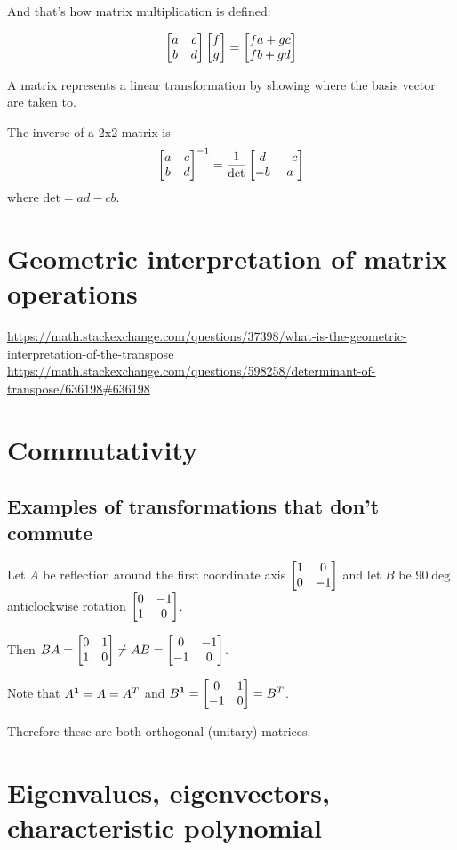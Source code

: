 And that's how matrix multiplication is defined:

$$
\begin{bmatrix}a & c\\b & d\\ \end{bmatrix} \begin{bmatrix}f\\g\end{bmatrix} = \begin{bmatrix}fa + gc\\fb + gd\end{bmatrix}
$$


A matrix represents a linear transformation by showing where the basis vector
are taken to.

\begin{theorem}
  The inverse of a 2x2 matrix is
  \begin{align*}
   \begin{bmatrix}a & c\\b & d\\ \end{bmatrix}^{-1}
  =
  \frac{1}{\text{det}} \begin{bmatrix}d  & -c\\-b & a\\ \end{bmatrix}
  \end{align*}
  where $\text{det} = ad - cb$.
\end{theorem}

\section{Geometric interpretation of matrix operations}
\url{https://math.stackexchange.com/questions/37398/what-is-the-geometric-interpretation-of-the-transpose}
\url{https://math.stackexchange.com/questions/598258/determinant-of-transpose/636198#636198}


\section{Commutativity}
\subsection{Examples of transformations that don't commute}
Let $A$ be reflection around the first coordinate axis $\begin{bmatrix}1 & 0\\0 & -1\\ \end{bmatrix}$
and let $B$ be $90\deg$ anticlockwise rotation $\begin{bmatrix}0 & -1\\1 & 0\\ \end{bmatrix}$.

Then $BA = \begin{bmatrix}0 & 1\\1 & 0\\ \end{bmatrix}
\neq  AB = \begin{bmatrix}0 & -1\\-1 & 0\\ \end{bmatrix}$.

Note that $A^{\mathbf 1} = A = A^T$ and $B^{\mathbf 1} = \begin{bmatrix}0 & 1\\-1 & 0\\ \end{bmatrix} = B^T$.

Therefore these are both orthogonal (unitary) matrices.


\section{Eigenvalues, eigenvectors, characteristic polynomial}

